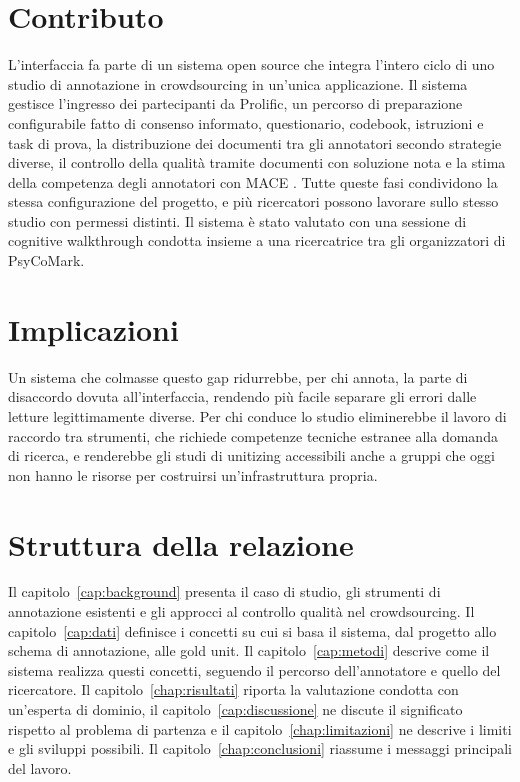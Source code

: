 \documentclass[]{sapthesis}
\begin{document}
\section{Contributo}
\label{sec:contribution}

L'interfaccia fa parte di un sistema open source che integra l'intero ciclo di uno studio di annotazione in crowdsourcing in un'unica applicazione. Il sistema gestisce l'ingresso dei partecipanti da Prolific, un percorso di preparazione configurabile fatto di consenso informato, questionario, codebook, istruzioni e task di prova, la distribuzione dei documenti tra gli annotatori secondo strategie diverse, il controllo della qualità tramite documenti con soluzione nota e la stima della competenza degli annotatori con MACE \parencite{hovy2013mace}. Tutte queste fasi condividono la stessa configurazione del progetto, e più ricercatori possono lavorare sullo stesso studio con permessi distinti. Il sistema è stato valutato con una sessione di cognitive walkthrough condotta insieme a una ricercatrice tra gli organizzatori di PsyCoMark.

\section{Implicazioni}
\label{sec:implicazioni}

Un sistema che colmasse questo gap ridurrebbe, per chi annota, la parte di disaccordo dovuta all'interfaccia, rendendo più facile separare gli errori dalle letture legittimamente diverse. Per chi conduce lo studio eliminerebbe il lavoro di raccordo tra strumenti, che richiede competenze tecniche estranee alla domanda di ricerca, e renderebbe gli studi di unitizing accessibili anche a gruppi che oggi non hanno le risorse per costruirsi un'infrastruttura propria.

\section{Struttura della relazione}
\label{sec:struttura}

Il capitolo~\ref{cap:background} presenta il caso di studio, gli strumenti di annotazione esistenti e gli approcci al controllo qualità nel crowdsourcing. Il capitolo~\ref{cap:dati} definisce i concetti su cui si basa il sistema, dal progetto allo schema di annotazione, alle gold unit. Il capitolo~\ref{cap:metodi} descrive come il sistema realizza questi concetti, seguendo il percorso dell'annotatore e quello del ricercatore. Il capitolo~\ref{chap:risultati} riporta la valutazione condotta con un'esperta di dominio, il capitolo~\ref{cap:discussione} ne discute il significato rispetto al problema di partenza e il capitolo~\ref{chap:limitazioni} ne descrive i limiti e gli sviluppi possibili. Il capitolo~\ref{chap:conclusioni} riassume i messaggi principali del lavoro.
\end{document}
